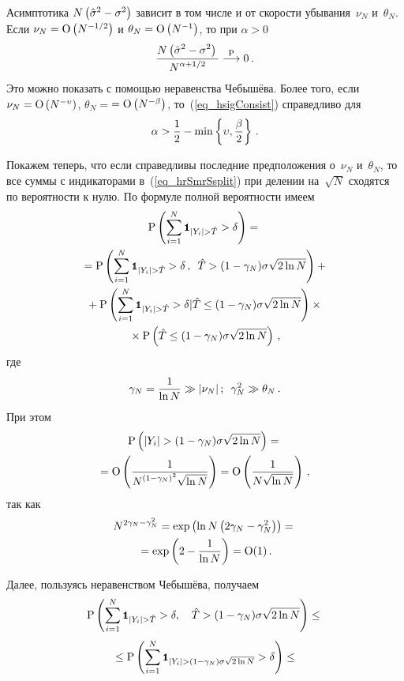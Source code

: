 \begin{multicols}{2}
Асимптотика $N\left(\hat\sigma^2-\sigma^2\right)$ зависит в том чис\-ле и от 
скорости убывания~$\nu_N$ и~$\theta_N$. Если $\nu_N=\textrm{O}\left(N^{-1/2}\right)$ и 
$\theta_N=\textrm{O}\left(N^{-1}\right)$, то при $\alpha>0$
\begin{equation}
\label{eq_hsigConsist}
\displaystyle\frac{\displaystyle N\left(\hat\sigma^2-\sigma^2\right)\mathstrut}{\displaystyle N^{\alpha+1/2}\mathstrut}\stackrel{\textrm{P}}{\longrightarrow} 0\,.
\end{equation}
Это можно показать с помощью неравенства Чебышёва. Более того, 
если $\nu_N=\textrm{O}\left(N^{-\upsilon}\right)$, $\theta_N=$\linebreak $=\textrm{O}\left(N^{-\beta}\right)$, 
то~(\ref{eq_hsigConsist}) справедливо для
\begin{equation*}
\alpha>\displaystyle\frac{\displaystyle 1\mathstrut}{\displaystyle 2\mathstrut}-\min\left\{\upsilon, \displaystyle\frac{\displaystyle \beta\mathstrut}{\displaystyle 2\mathstrut}\right\}\,.
\end{equation*}

Покажем теперь, что если справедливы последние предположения о~$\nu_N$ и~$\theta_N$, 
то все суммы с индикаторами в~(\ref{eq_hrSmrSsplit}) при делении на~$\sqrt{N}$ 
сходятся по вероятности к нулю. По формуле полной вероятности имеем
\begin{multline}
\label{eq_fullProbForGammaN}
\prbblty\left(\sum_{i=1}^{N}\indYighT>\delta\right)={}\\
{}=\prbblty\left(\sum_{i=1}^{N}\indYighT>\delta\,, \enskip\hat T>(1-\gamma_N)\sigma\sqrt{2\ln N}\right)+{}\\
{}+\prbblty\left(\sum_{i=1}^{N}\indYighT>\delta|\hat T\leq(1-\gamma_N)\sigma\sqrt{2\ln N}\right)\times{}\\
{}\times \prbblty\left(\hat T\leq(1-\gamma_N)\sigma\sqrt{2\ln N}\right)\,,
\end{multline}
где
\begin{equation*}
\gamma_N=\displaystyle\frac{\displaystyle 1\mathstrut}{\displaystyle \ln N\mathstrut}\gg |\nu_N|\,;\enskip \gamma_N^2\gg\theta_N\,.
\end{equation*}
При этом
\begin{multline*}
\prbblty\left(|Y_i|>(1-\gamma_N)\sigma\sqrt{2\ln N}\right)={}\\
=\Obig\left(\fr{1}{N^{(1-\gamma_N)^2}\sqrt{\ln N}}\right)=
\Obig\left(\fr{1}{N\sqrt{\ln N}}\right)\,,
\end{multline*}
так как
\begin{multline*}
N^{2\gamma_N-\gamma_N^2}=
\exp\left(\ln N\left(2\gamma_N-\gamma_N^2\right)\right)={}\\
{}=\exp\left(2-\displaystyle\frac{\displaystyle 1\mathstrut}{\displaystyle \ln N\mathstrut}\right)=\textrm{O}(1)\,.
\end{multline*}

Далее, пользуясь неравенством Чебышёва, получаем
$$
\prbblty\left(\sum_{i=1}^{N}\indYighT>\delta, \quad\hat T>(1-\gamma_N)\sigma\sqrt{2\ln N}\right)\leq{}
$$$$%
{}\leq \prbblty\left(\sum_{i=1}^{N}\Ik_{|Y_i|>(1-\gamma_N)\sigma\sqrt{2\ln N}}>\delta\right)\leq{}$$


\end{multicols}
